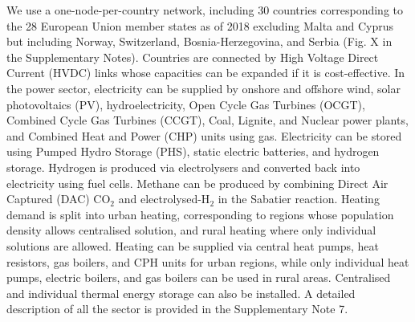 \documentclass[5p]{elsarticle} %
\begin{document}
We use a one-node-per-country network, including 30 countries corresponding to the 28 European Union member states as of 2018 excluding Malta and Cyprus but including Norway, Switzerland, Bosnia-Herzegovina, and Serbia (Fig. \textcolor[rgb]{1,0,0}{X} in the Supplementary Notes). Countries are connected by High Voltage Direct Current (HVDC) links whose capacities can be expanded if it is cost-effective. In the power sector, electricity can be supplied by onshore and offshore wind, solar photovoltaics (PV), hydroelectricity, Open Cycle Gas Turbines (OCGT), Combined Cycle Gas Turbines (CCGT), Coal, Lignite, and Nuclear power plants, and Combined Heat and Power (CHP) units using gas. Electricity can be stored using Pumped Hydro Storage (PHS), static electric batteries, and hydrogen storage. Hydrogen is produced via electrolysers and converted back into electricity using fuel cells. Methane can be produced by combining Direct Air Captured (DAC) CO$_2$ and electrolysed-H$_2$ in the Sabatier reaction.  
Heating demand is split into urban heating, corresponding to regions whose population density allows centralised solution, and rural heating where only individual solutions are allowed. Heating can be supplied via central heat pumps, heat resistors, gas boilers, and CPH units for urban regions, while only individual heat pumps, electric boilers, and gas boilers can be used in rural areas. Centralised and individual thermal energy storage can also be installed. A detailed description of all the sector is provided in the Supplementary Note 7. \
\end{document}
